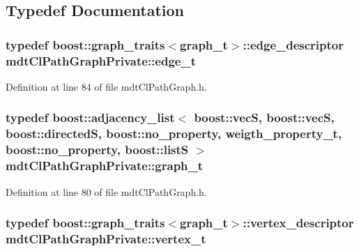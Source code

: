 \subsection{Typedef Documentation}
\hypertarget{namespacemdt_cl_path_graph_private_a96eb891b98d89bbea2f573cd8f3accd2}{
\subsubsection[{edge\-\_\-t}]{\setlength{\rightskip}{0pt plus 5cm}typedef boost\-::graph\-\_\-traits$<${\bf graph\-\_\-t}$>$\-::edge\-\_\-descriptor {\bf mdt\-Cl\-Path\-Graph\-Private\-::edge\-\_\-t}}}\label{namespacemdt_cl_path_graph_private_a96eb891b98d89bbea2f573cd8f3accd2}


Definition at line 84 of file mdt\-Cl\-Path\-Graph.\-h.

\hypertarget{namespacemdt_cl_path_graph_private_a0f07a8bdf4fa7671a93fe91d536b4793}{
\subsubsection[{graph\-\_\-t}]{\setlength{\rightskip}{0pt plus 5cm}typedef boost\-::adjacency\-\_\-list$<$ boost\-::vec\-S, boost\-::vec\-S, boost\-::directed\-S, boost\-::no\-\_\-property, {\bf weigth\-\_\-property\-\_\-t}, boost\-::no\-\_\-property, boost\-::list\-S $>$ {\bf mdt\-Cl\-Path\-Graph\-Private\-::graph\-\_\-t}}}\label{namespacemdt_cl_path_graph_private_a0f07a8bdf4fa7671a93fe91d536b4793}


Definition at line 80 of file mdt\-Cl\-Path\-Graph.\-h.

\hypertarget{namespacemdt_cl_path_graph_private_a0aaa28f25df9a7fcd4602cc15b3b3795}{
\subsubsection[{vertex\-\_\-t}]{\setlength{\rightskip}{0pt plus 5cm}typedef boost\-::graph\-\_\-traits$<${\bf graph\-\_\-t}$>$\-::vertex\-\_\-descriptor {\bf mdt\-Cl\-Path\-Graph\-Private\-::vertex\-\_\-t}}}\label{namespacemdt_cl_path_graph_private_a0aaa28f25df9a7fcd4602cc15b3b3795}


